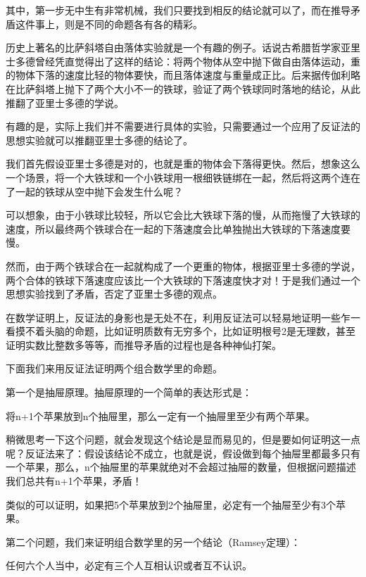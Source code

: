 \documentclass[12pt, letterpaper]{ctexrep}
\newenvironment{shadedquotation}
 {\begin{shaded*}
  \quoting[leftmargin=5pt, rightmargin=5pt, vskip=0pt]
 }
 {\endquoting
 \end{shaded*}
}
\begin{document}
其中，第一步无中生有非常机械，我们只要找到相反的结论就可以了，而在推导矛盾这件事上，则是不同的命题各有各的精彩。

历史上著名的比萨斜塔自由落体实验就是一个有趣的例子。话说古希腊哲学家亚里士多德曾经凭直觉得出了这样的结论：将两个物体从空中抛下做自由落体运动，重的物体下落的速度比轻的物体要快，而且落体速度与重量成正比。后来据传伽利略在比萨斜塔上抛下了两个大小不一的铁球，验证了两个铁球同时落地的结论，从此推翻了亚里士多德的学说。

有趣的是，实际上我们并不需要进行具体的实验，只需要通过一个应用了反证法的思想实验就可以推翻亚里士多德的结论了。

我们首先假设亚里士多德是对的，也就是重的物体会下落得更快。然后，想象这么一个场景，将一个大铁球和一个小铁球用一根细铁链绑在一起，然后将这两个连在了一起的铁球从空中抛下会发生什么呢？

可以想象，由于小铁球比较轻，所以它会比大铁球下落的慢，从而拖慢了大铁球的速度，所以最终两个铁球合在一起的下落速度会比单独抛出大铁球的下落速度要慢。

然而，由于两个铁球合在一起就构成了一个更重的物体，根据亚里士多德的学说，两个合体的铁球下落速度应该比一个大铁球的下落速度快才对！于是我们通过一个思想实验找到了矛盾，否定了亚里士多德的观点。

在数学证明上，反证法的身影也是无处不在，利用反证法可以轻易地证明一些乍一看摸不着头脑的命题，比如证明质数有无穷多个，比如证明根号2是无理数，甚至证明实数比整数多等等，而推导矛盾的过程也是各种神仙打架。

下面我们来用反证法证明两个组合数学里的命题。

第一个是抽屉原理。抽屉原理的一个简单的表达形式是：

\begin{shadedquotation}
\noindent
将n+1个苹果放到n个抽屉里，那么一定有一个抽屉里至少有两个苹果。
\end{shadedquotation}


稍微思考一下这个问题，就会发现这个结论是显而易见的，但是要如何证明这一点呢？反证法来了：假设该结论不成立，也就是说，假设做到每个抽屉里都最多只有一个苹果，那么，n个抽屉里的苹果就绝对不会超过抽屉的数量，但根据问题描述我们总共有n+1个苹果，矛盾！

类似的可以证明，如果把5个苹果放到2个抽屉里，必定有一个抽屉至少有3个苹果。

第二个问题，我们来证明组合数学里的另一个结论（Ramsey定理）：

\begin{shadedquotation}
\noindent
任何六个人当中，必定有三个人互相认识或者互不认识。
\end{shadedquotation}
\end{document}
